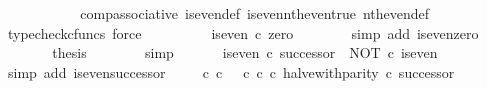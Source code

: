 \begin{isabellebody}
\ {\isachardoublequoteopen}{\isachardot}{\kern0pt}{\isachardot}{\kern0pt}{\isachardot}{\kern0pt}\ {\isacharequal}{\kern0pt}\ {\isasymt}{\isachardoublequoteclose}\isanewline
\ \ \ \ \ \ \isamarkupfalse%
\ comp{\isacharunderscore}{\kern0pt}associative{}\ is{\isacharunderscore}{\kern0pt}even{\isacharunderscore}{\kern0pt}def{}\ is{\isacharunderscore}{\kern0pt}even{\isacharunderscore}{\kern0pt}nth{\isacharunderscore}{\kern0pt}even{\isacharunderscore}{\kern0pt}true\ nth{\isacharunderscore}{\kern0pt}even{\isacharunderscore}{\kern0pt}def{}\ \isamarkupfalse%
\ {\isacharparenleft}{\kern0pt}typecheck{\isacharunderscore}{\kern0pt}cfuncs{\isacharcomma}{\kern0pt}\ force{\isacharparenright}{\kern0pt}\isanewline
\ \ \ \ \isamarkupfalse%
\ \isamarkupfalse%
\ {\isachardoublequoteopen}{\isachardot}{\kern0pt}{\isachardot}{\kern0pt}{\isachardot}{\kern0pt}\ {\isacharequal}{\kern0pt}\ is{\isacharunderscore}{\kern0pt}even\ {\isasymcirc}\isactrlsub c\ zero{\isachardoublequoteclose}\isanewline
\ \ \ \ \ \ \isamarkupfalse%
\ {\isacharparenleft}{\kern0pt}simp\ add{\isacharcolon}{\kern0pt}\ is{\isacharunderscore}{\kern0pt}even{\isacharunderscore}{\kern0pt}zero{\isacharparenright}{\kern0pt}\isanewline
\ \ \ \ \isamarkupfalse%
\ \isamarkupfalse%
\ {\isacharquery}{\kern0pt}thesis\isanewline
\ \ \ \ \ \ \isamarkupfalse%
\ simp\isanewline
\ \ \isamarkupfalse%
\isanewline
\isanewline
\ \ \isamarkupfalse%
\ {\isachardoublequoteopen}is{\isacharunderscore}{\kern0pt}even\ {\isasymcirc}\isactrlsub c\ successor\ {\isacharequal}{\kern0pt}\ NOT\ {\isasymcirc}\isactrlsub c\ is{\isacharunderscore}{\kern0pt}even{\isachardoublequoteclose}\isanewline
\ \ \ \ \isamarkupfalse%
\ {\isacharparenleft}{\kern0pt}simp\ add{\isacharcolon}{\kern0pt}\ is{\isacharunderscore}{\kern0pt}even{\isacharunderscore}{\kern0pt}successor{\isacharparenright}{\kern0pt}\isanewline
\isanewline
\ \ \isamarkupfalse%
\ {\isachardoublequoteopen}{\isacharparenleft}{\kern0pt}{\isacharparenleft}{\kern0pt}{\isasymt}\ {\isasymcirc}\isactrlsub c\ {\isasymbeta}\isactrlbsub {\isasymnat}\isactrlsub c\isactrlesub {\isacharparenright}{\kern0pt}\ {\isasymamalg}\ {\isacharparenleft}{\kern0pt}{\isasymf}\ {\isasymcirc}\isactrlsub c\ {\isasymbeta}\isactrlbsub {\isasymnat}\isactrlsub c\isactrlesub {\isacharparenright}{\kern0pt}\ {\isasymcirc}\isactrlsub c\ halve{\isacharunderscore}{\kern0pt}with{\isacharunderscore}{\kern0pt}parity{\isacharparenright}{\kern0pt}\ {\isasymcirc}\isactrlsub c\ successor\ {\isacharequal}{\kern0pt}\isanewline

\end{isabellebody}
